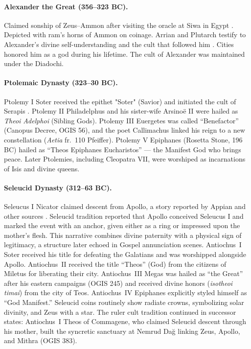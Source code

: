 \paragraph{Alexander the Great (356--323 BC).}
Claimed sonship of Zeus--Ammon after visiting the oracle at Siwa in Egypt \cite[27]{plutarch:lives}.
Depicted with ram’s horns of Ammon on coinage.
Arrian and Plutarch testify to Alexander's divine self-understanding and the cult that followed him \cite{plutarch:lives}.
Cities honored him as a god during his lifetime.
The cult of Alexander was maintained under the Diadochi.

\paragraph{Ptolemaic Dynasty (323--30 BC).}
Ptolemy I Soter received the epithet "Soter" (Savior) and initiated the cult of Serapis \cite[4.83--84]{tacitus:histories}.
Ptolemy II Philadelphus and his sister-wife Arsinoë II were hailed as \textit{Theoi Adelphoi} (Sibling Gods).
Ptolemy III Euergetes was called ``Benefactor'' (Canopus Decree, OGIS 56), and the poet Callimachus linked his reign to a new constellation (\emph{Aetia} fr.~110 Pfeiffer).
Ptolemy V Epiphanes (Rosetta Stone, 196 BC) hailed as “Theos Epiphanes Eucharistos” --- the Manifest God who brings peace.
Later Ptolemies, including Cleopatra VII, were worshiped as incarnations of Isis and divine queens.

\paragraph{Seleucid Dynasty (312--63 BC).}
Seleucus I Nicator claimed descent from Apollo, a story reported by Appian and other sources \cite[56]{appian:romanhistory}.
Seleucid tradition reported that Apollo conceived Seleucus I and marked the event with an anchor, given either as a ring or impressed upon the mother's flesh.
This narrative combines divine paternity with a physical sign of legitimacy, a structure later echoed in Gospel annunciation scenes.
Antiochus~I Soter received his title for defeating the Galatians and was worshipped alongside Apollo.
Antiochus~II received the title ``Theos'' (God) from the citizens of Miletus for liberating their city.
Antiochus~III Megas was hailed as ``the Great'' after his eastern campaigns (OGIS 245) and received divine honors (\emph{isotheoi timai}) from the city of Teos.
Antiochus~IV Epiphanes explicitly styled himself as ``God Manifest.''
Seleucid coins routinely show radiate crowns, symbolizing solar divinity, and Zeus with a star.
The ruler cult tradition continued in successor states: Antiochus~I Theos of Commagene, who claimed Seleucid descent through his mother, built the syncretic sanctuary at Nemrud Dağ linking Zeus, Apollo, and Mithra (OGIS 383).

